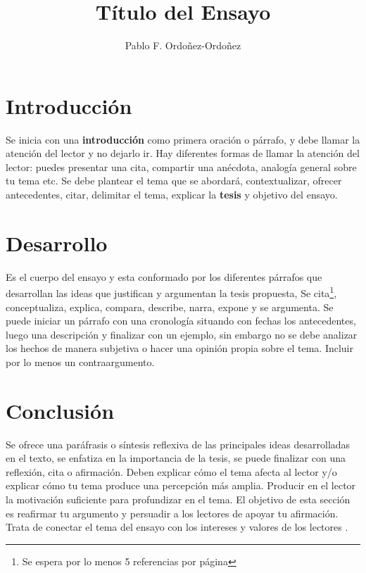 \documentclass[a4paper,12pt]{article}
\title{Título del Ensayo}
\author[1]{
  Pablo F. Ordoñez-Ordoñez \orcid{0000-0001-8079-7694} 
}
\affil[1]{Universidad Nacional de Loja, Ecuador, Facultad de Energía, CIS, \href{mailto:pfordonez@unl.edu.ec}{pfordonez@unl.edu.ec}}
\begin{document}
\maketitle

\section{Introducción}

Se inicia con una \textbf{introducción} como primera oración o párrafo, y debe llamar la atención del lector y no dejarlo ir. Hay diferentes formas de llamar la atención del lector: puedes presentar una cita,  compartir una anécdota, analogía general sobre tu tema etc. Se debe plantear el tema que se abordará, contextualizar, ofrecer antecedentes, citar, delimitar el tema, explicar la \textbf{tesis} y objetivo del ensayo.


\section{Desarrollo}

Es el cuerpo del ensayo y esta conformado por los diferentes párrafos que desarrollan las ideas que justifican y argumentan la tesis propuesta, Se cita\footnote{Se espera por lo menos 5 referencias por página}, conceptualiza, explica, compara, describe, narra, expone y se argumenta. Se puede iniciar un párrafo con una cronología situando con fechas los antecedentes, luego una descripción y finalizar con un ejemplo, sin embargo no se debe analizar los hechos de manera subjetiva o hacer una opinión propia sobre el tema. Incluir por lo menos un contraargumento. 






\section{Conclusión}
Se ofrece una paráfrasis o síntesis reflexiva de las principales ideas desarrolladas en el texto, se enfatiza en la importancia de la tesis, se puede finalizar con una reflexión, cita o afirmación. Deben explicar cómo el tema afecta al lector y/o explicar cómo tu tema produce una percepción más amplia. Producir en el lector la motivación suficiente para profundizar en el tema. El objetivo de esta sección es reafirmar tu argumento y persuadir a los lectores de apoyar tu afirmación. Trata de conectar el tema del ensayo con los intereses y valores de los lectores \cite{youArg} \cite{web1}.
\end{document}
